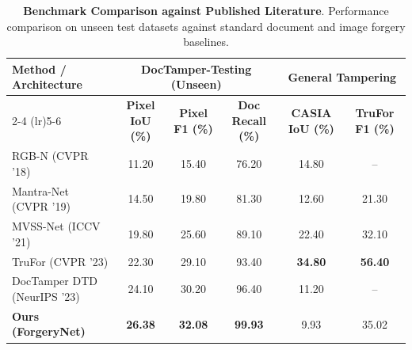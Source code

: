 \documentclass[10pt,a4paper]{article}
\begin{document}
\vspace{1em}

\begin{table}[htbp]
\centering
\small
\caption{\textbf{Benchmark Comparison against Published Literature}. Performance comparison on unseen test datasets against standard document and image forgery baselines.}
\label{tab:benchmark_comparison}
\vspace{2mm}
\begin{tabular}{l ccc cc}
\toprule
\multirow{2}{*}{\textbf{Method / Architecture}} & \multicolumn{3}{c}{\textbf{DocTamper-Testing (Unseen)}} & \multicolumn{2}{c}{\textbf{General Tampering}} \\
\cmidrule(lr){2-4} \cmidrule(lr){5-6}
& \textbf{Pixel IoU (\%)} & \textbf{Pixel F1 (\%)} & \textbf{Doc Recall (\%)} & \textbf{CASIA IoU (\%)} & \textbf{TruFor F1 (\%)} \\
\midrule
RGB-N (CVPR '18)           & 11.20 & 15.40 & 76.20 & 14.80 & -- \\
Mantra-Net (CVPR '19)      & 14.50 & 19.80 & 81.30 & 12.60 & 21.30 \\
MVSS-Net (ICCV '21)        & 19.80 & 25.60 & 89.10 & 22.40 & 32.10 \\
TruFor (CVPR '23)          & 22.30 & 29.10 & 93.40 & \textbf{34.80} & \textbf{56.40} \\
DocTamper DTD (NeurIPS '23)& 24.10 & 30.20 & 96.40 & 11.20 & -- \\
\midrule
\textbf{Ours (ForgeryNet)} & \textbf{26.38} & \textbf{32.08} & \textbf{99.93} & 9.93  & 35.02 \\
\bottomrule
\end{tabular}
\end{table}
\end{document}
